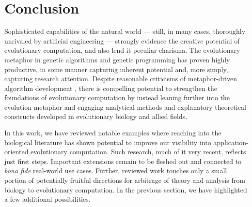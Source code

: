 
\section{Conclusion} \label{sec:conclusion}

Sophisticated capabilities of the natural world --- still, in many cases, thoroughly unrivaled by artificial engineering --- strongly evidence the creative potential of evolutionary computation, and also lend it peculiar charisma.
The evolutionary metaphor in genetic algorithms and genetic programming has proven highly productive, in some manner capturing inherent potential and, more simply, capturing research attention.
Despite reasonable criticisms of metaphor-driven algorithm development , there is compelling potential to strengthen the foundations of evolutionary computation by instead leaning further into the evolution metaphor and engaging analytical methods and explanatory theoretical constructs developed in evolutionary biology and allied fields.

In this work, we have reviewed notable examples where reaching into the biological literature has shown potential to improve our visibility into application-oriented evolutionary computation.
Such research, much of it very recent, reflects just first steps.
Important extensions remain to be fleshed out and connected to \textit{bona fide} real-world use cases.
Further, reviewed work touches only a small portion of potentially fruitful directions for arbitrage of theory and analysis from biology to evolutionary computation.
In the previous section, we have highlighted a few additional possibilities.

